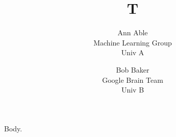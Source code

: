 \documentclass{article}
\begin{document}
\title{T}
\author{Ann Able\\ Machine Learning Group\\ Univ A \and Bob Baker\\ Google Brain Team\\ Univ B}
\maketitle
Body.
\end{document}
